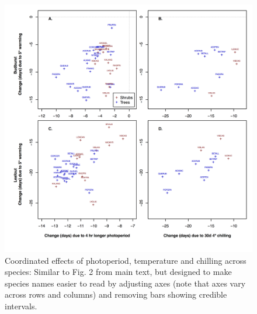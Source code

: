 \documentclass{article}
\begin{document}
\begin{figure}
\label{figS5}
\includegraphics[width=1\textwidth]{Fig2_4panel_ZoomSupp.png}
\caption{Coordinated effects of photoperiod, temperature and chilling across species: Similar to Fig. 2 from main text, but designed to make species names easier to read by adjusting axes (note that axes vary across rows and columns) and removing bars showing credible intervals. }
\end{figure}
\end{document}

